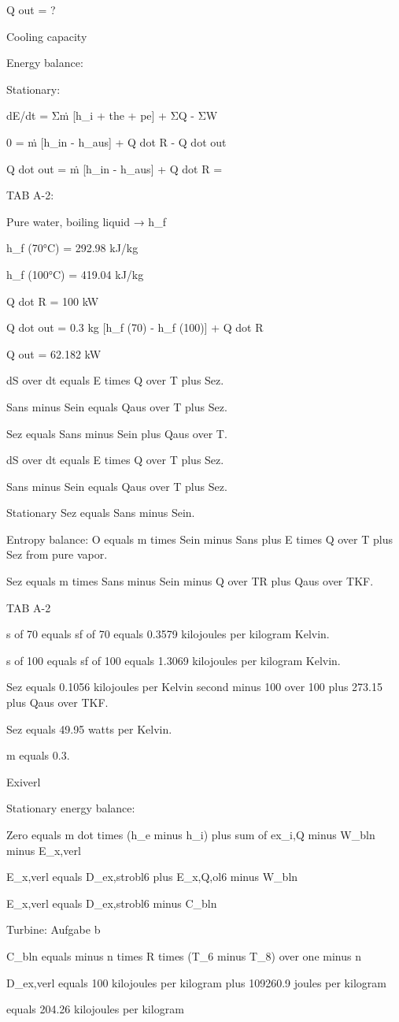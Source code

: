Q out = ?

Cooling capacity

Energy balance:

Stationary:

dE/dt = Σṁ [h_i + the + pe] + ΣQ - ΣW

0 = ṁ [h_in - h_aus] + Q dot R - Q dot out

Q dot out = ṁ [h_in - h_aus] + Q dot R =

TAB A-2:

Pure water, boiling liquid → h_f

h_f (70°C) = 292.98 kJ/kg

h_f (100°C) = 419.04 kJ/kg

Q dot R = 100 kW

Q dot out = 0.3 kg [h_f (70) - h_f (100)] + Q dot R

Q out = 62.182 kW

dS over dt equals E times Q over T plus Sez.

Sans minus Sein equals Qaus over T plus Sez.

Sez equals Sans minus Sein plus Qaus over T.

dS over dt equals E times Q over T plus Sez.

Sans minus Sein equals Qaus over T plus Sez.

Stationary Sez equals Sans minus Sein.

Entropy balance: O equals m times Sein minus Sans plus E times Q over T plus Sez from pure vapor.

Sez equals m times Sans minus Sein minus Q over TR plus Qaus over TKF.

TAB A-2

s of 70 equals sf of 70 equals 0.3579 kilojoules per kilogram Kelvin.

s of 100 equals sf of 100 equals 1.3069 kilojoules per kilogram Kelvin.

Sez equals 0.1056 kilojoules per Kelvin second minus 100 over 100 plus 273.15 plus Qaus over TKF.

Sez equals 49.95 watts per Kelvin.

m equals 0.3.

Exiverl

Stationary energy balance:

Zero equals m dot times (h_e minus h_i) plus sum of ex_i,Q minus W_bln minus E_x,verl

E_x,verl equals D_ex,strobl6 plus E_x,Q,ol6 minus W_bln

E_x,verl equals D_ex,strobl6 minus C_bln

Turbine: Aufgabe b

C_bln equals minus n times R times (T_6 minus T_8) over one minus n

D_ex,verl equals 100 kilojoules per kilogram plus 109260.9 joules per kilogram

equals 204.26 kilojoules per kilogram